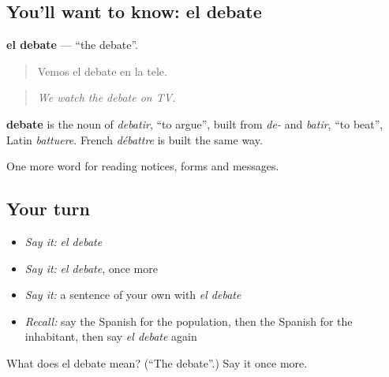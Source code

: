 \subsection*{You'll want to know: el debate}
\textbf{el debate} — \textquotedblleft{}the debate\textquotedblright{}.

\begin{quote}
Vemos el debate en la tele.
\end{quote}

\begin{quote}
\emph{We watch the debate on TV.}
\end{quote}

\begin{cousinweb}
\textbf{debate} is the noun of \emph{debatir}, \textquotedblleft{}to argue\textquotedblright{}, built from \emph{de-} and \emph{batir}, \textquotedblleft{}to beat\textquotedblright{}, Latin \emph{battuere}. French \emph{débattre} is built the same way.
\end{cousinweb}

\begin{grammarlens}[title={What you've built}]
One more word for reading notices, forms and messages.
\end{grammarlens}

\subsection*{Your turn}
\begin{itemize}
\raggedright
  \item \emph{Say it:} \emph{el debate}
  \item \emph{Say it:} \emph{el debate}, once more
  \item \emph{Say it:} a sentence of your own with \emph{el debate}
  \item \emph{Recall:} say the Spanish for the population, then the Spanish for the inhabitant, then say \emph{el debate} again
\end{itemize}

\begin{tcolorbox}[breakable,colback=teal!4,colframe=teal!35!black,title={Before you move on}]
What does el debate mean? (\textquotedblleft{}The debate\textquotedblright{}.) Say it once more.
\end{tcolorbox}
